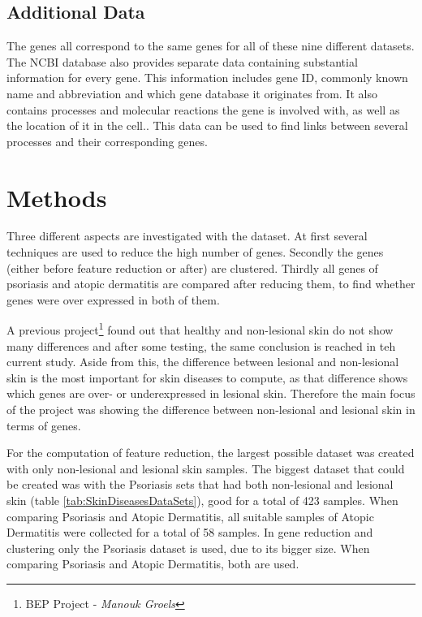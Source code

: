 \documentclass[10pt,a4paper]{article}
\begin{document}
	\subsection{Additional Data}
	\label{subsec:AdditionalData}
	
	The genes all correspond to the same genes for all of these nine different datasets. The NCBI database\cite{edgar2002gene} also provides separate data containing substantial information for every gene. This information includes gene ID, commonly known name and abbreviation and which gene database it originates from. It also contains processes and molecular reactions the gene is involved with, as well as the location of it in the cell.. This data can be used to find links between several processes and their corresponding genes.
	
	\section{Methods}
	\label{sec:Methods}
	
	Three different aspects are investigated with the dataset. At first several techniques are used to reduce the high number of genes. Secondly the genes (either before feature reduction or after) are clustered. Thirdly all genes of psoriasis and atopic dermatitis are compared after reducing them, to find whether genes were over expressed in both of them.
	
	A previous project\footnote{BEP Project -\textit{ Manouk Groels}} found out that healthy and non-lesional skin do not show many differences and after some testing, the same conclusion is reached in teh current study. Aside from this, the difference between lesional and non-lesional skin is the most important for skin diseases to compute, as that difference shows which genes are over- or underexpressed in lesional skin. Therefore the main focus of the project was showing the difference between non-lesional and lesional skin in terms of genes. 
	
	For the computation of feature reduction, the largest possible dataset was created with only non-lesional and lesional skin samples. The biggest dataset that could be created was with the Psoriasis sets that had both non-lesional and lesional skin (table \ref{tab:SkinDiseasesDataSets}), good for a total of 423 samples. When comparing Psoriasis and Atopic Dermatitis, all suitable samples of Atopic Dermatitis were collected for a total of 58 samples. In gene reduction and clustering only the Psoriasis dataset is used, due to its bigger size. When comparing Psoriasis and Atopic Dermatitis, both are used.
	
\end{document}
